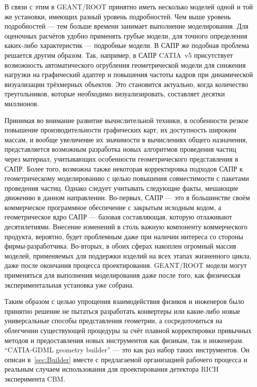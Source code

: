 В связи с этим в GEANT/ROOT принятно иметь несколько моделей одной и той же установки, имеющих разный уровень подробностей. Чем выше уровень подробностей --- тем больше времени занимает выполнение моделирования. Для оценочных расчётов удобно применять грубые модели, для точного определения каких-либо характеристик --- подробные модели. В САПР же подобная проблема решается другим образом. Так, например, в САПР CATIA~v5 присутствует возможность автоматического огрубления геометрической модели для снижения нагрузки на графический адаптер и повышения частоты кадров при динамической визуализации трёхмерных объектов. Это становится актуально, когда количество треугольников, которые необходимо визуализировать, составляет десятки миллионов.

Принимая во внимание развитие вычислительной техники, в особенности резкое повышение производительности графических карт, их доступность широким массам, и вообще увеличение их значимости в вычислениях общего назначения, представляется возможным разработка новых алгоритмов проведения частиц через материал, учитывающих особенности геометрического представления в САПР. Более того, возможна также некоторая корректировка подходов САПР к геометрическому моделированию с целью повышения совместимости с пакетами проведения частиц. Однако следует учитывать следующие факты, мешающие движению в данном направлении. Во-первых, САПР --- это в большинстве своём коммерческое программное обеспечение с закрытым исходным кодом, а геометрическое ядро САПР --- базовая составляющая, которую отлаживают десятилетиями. Внесение изменений в столь важную компоненту коммерческого продукта, вероятно, будет проблемным даже при наличии интереса со стороны фирмы-разработчика. Во-вторых, в обоих сферах накоплен огромный массив моделей, применяемых для поддержки изделий на всех этапах жизненного цикла, даже после окончания процесса проектирования. GEANT/ROOT модели могут применяться для выполнения моделирования даже после того, как физическая экспериментальная установка уже собрана.

Таким образом с целью упрощения взаимодействия физиков и инженеров было принятно решение не пытаться разработать конвертеры или какие-либо новые универсальные способы представления геометрии, а сосредоточиться на облегчении существующей процедуры за счёт плавной корректировки привычных методов и предоставления новых инструментов как физикам, так и инженерам. ``CATIA-GDML geometry builder'' --- это как раз набор таких инструментов. Он описан в~\ref{sec:Builder} вместе с предлагаемой организацией рабочего процесса и реальным случаем использования для проектирования детектора RICH эксперимента CBM.
